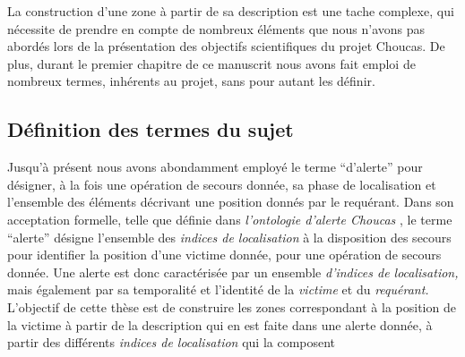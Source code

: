 La construction d'une zone à partir de sa description est une tache
complexe, qui nécessite de prendre en compte de nombreux éléments que
nous n'avons pas abordés lors de la présentation des objectifs
scientifiques du projet Choucas. De plus, durant le premier chapitre
de ce manuscrit nous avons fait emploi de nombreux termes, inhérents
au projet, sans pour autant les définir.

\subsection{Définition des termes du sujet}

Jusqu'à présent nous avons abondamment employé le terme
\enquote{d'alerte} pour désigner, à la fois une opération de secours
donnée, sa phase de localisation et l'ensemble des éléments décrivant
une position donnés par le requérant. Dans son acceptation formelle,
\ie telle que définie dans \emph{l’ontologie d'alerte Choucas}
\autocite[\ac{oac},][]{Viry2019}, le terme \enquote{alerte} désigne
l'ensemble des \emph{indices de localisation} à la disposition des
secours pour identifier la position d'une victime donnée, pour une
opération de secours donnée. Une alerte est donc caractérisée par un
ensemble \emph{d'indices de localisation,} mais également par sa
temporalité et l'identité de la \emph{victime} et du \emph{requérant.}
L'objectif de cette thèse est de construire les zones correspondant à
la position de la victime à partir de la description qui en est faite
dans une alerte donnée, \ie à partir des différents \emph{indices de
  localisation} qui la composent

